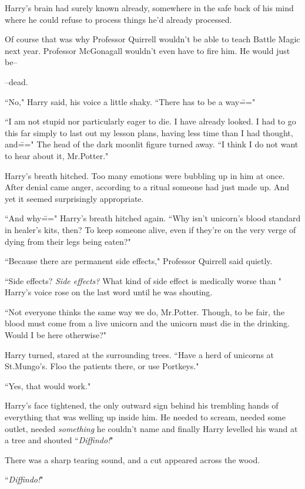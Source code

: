 Harry's brain had surely known already, somewhere in the safe back of his mind where he could refuse to process things he'd already processed.

Of course that was why Professor Quirrell wouldn't be able to teach Battle Magic next year. Professor McGonagall wouldn't even have to fire him. He would just be\---

\---dead.

``No," Harry said, his voice a little shaky. ``There has to be a way\==="

``I am not stupid nor particularly eager to die. I have already looked. I had to go this far simply to last out my lesson plans, having less time than I had thought, and\===" The head of the dark moonlit figure turned away. ``I think I do not want to hear about it, Mr.\?Potter."

Harry's breath hitched. Too many emotions were bubbling up in him at once. After denial came anger, according to a ritual someone had just made up. And yet it seemed surprisingly appropriate.

``And why\===" Harry's breath hitched again. ``Why isn't unicorn's blood standard in healer's kits, then? To keep someone alive, even if they're on the very verge of dying from their legs being eaten?"

``Because there are permanent side effects," Professor Quirrell said quietly.

``Side effects? \emph{Side effects?} What kind of side effect is medically worse than " Harry's voice rose on the last word until he was shouting.

``Not everyone thinks the same way we do, Mr.\?Potter. Though, to be fair, the blood must come from a live unicorn and the unicorn must die in the drinking. Would I be here otherwise?"

Harry turned, stared at the surrounding trees. ``Have a herd of unicorns at St.\?Mungo's. Floo the patients there, or use Portkeys."

``Yes, that would work."

Harry's face tightened, the only outward sign behind his trembling hands of everything that was welling up inside him. He needed to scream, needed some outlet, needed \emph{something} he couldn't name and finally Harry levelled his wand at a tree and shouted ``\emph{Diffindo!}"

There was a sharp tearing sound, and a cut appeared across the wood.

``\emph{Diffindo!}"

